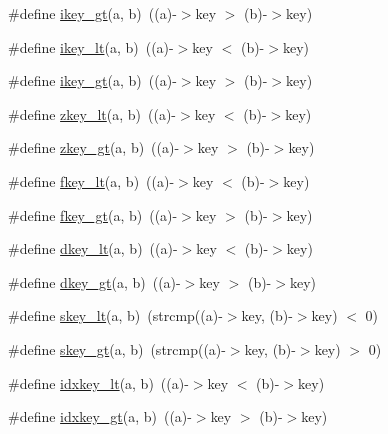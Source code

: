 \begin{DoxyCompactItemize}
\item 
\#define \hyperlink{a00140_af802b818526cc3a70c669f0b3115aa7f}{ikey\+\_\+gt}(a,  b)~((a)-\/$>$key $>$ (b)-\/$>$key)
\item 
\#define \hyperlink{a00140_ae2275beb4f8212a5a1b8299bd57f0595}{ikey\+\_\+lt}(a,  b)~((a)-\/$>$key $<$ (b)-\/$>$key)
\item 
\#define \hyperlink{a00140_af802b818526cc3a70c669f0b3115aa7f}{ikey\+\_\+gt}(a,  b)~((a)-\/$>$key $>$ (b)-\/$>$key)
\item 
\#define \hyperlink{a00140_a2c3ab0946b7cf6f4e549f475cd245ad5}{zkey\+\_\+lt}(a,  b)~((a)-\/$>$key $<$ (b)-\/$>$key)
\item 
\#define \hyperlink{a00140_a0012fecc13d9d851de1b0013074abc5a}{zkey\+\_\+gt}(a,  b)~((a)-\/$>$key $>$ (b)-\/$>$key)
\item 
\#define \hyperlink{a00140_ab5cae7ca35b402e472e555682bd250be}{fkey\+\_\+lt}(a,  b)~((a)-\/$>$key $<$ (b)-\/$>$key)
\item 
\#define \hyperlink{a00140_aaed10788298735e5b3c86a486d042e3d}{fkey\+\_\+gt}(a,  b)~((a)-\/$>$key $>$ (b)-\/$>$key)
\item 
\#define \hyperlink{a00140_a5250d8ab44d0e614a42fce703fef4ff5}{dkey\+\_\+lt}(a,  b)~((a)-\/$>$key $<$ (b)-\/$>$key)
\item 
\#define \hyperlink{a00140_a2e6b2f0794a489409e2145a59e361ab5}{dkey\+\_\+gt}(a,  b)~((a)-\/$>$key $>$ (b)-\/$>$key)
\item 
\#define \hyperlink{a00140_a5595011b8e4a8f5aca1494b1f5d69e4c}{skey\+\_\+lt}(a,  b)~(strcmp((a)-\/$>$key, (b)-\/$>$key) $<$ 0)
\item 
\#define \hyperlink{a00140_ab04d2c8592e14ea6c17053d48b2fab9d}{skey\+\_\+gt}(a,  b)~(strcmp((a)-\/$>$key, (b)-\/$>$key) $>$ 0)
\item 
\#define \hyperlink{a00140_a3ccbe09bb439fdc5791bd538cea60072}{idxkey\+\_\+lt}(a,  b)~((a)-\/$>$key $<$ (b)-\/$>$key)
\item 
\#define \hyperlink{a00140_aae538dbecd44af4bcfb90ec5dcacc842}{idxkey\+\_\+gt}(a,  b)~((a)-\/$>$key $>$ (b)-\/$>$key)
\end{DoxyCompactItemize}
